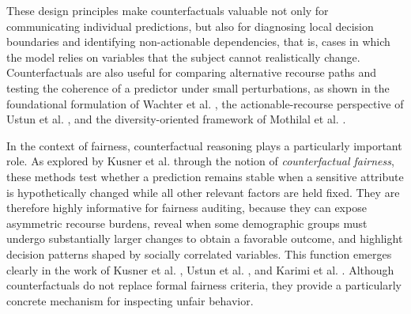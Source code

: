 These design principles make counterfactuals valuable not only for communicating individual predictions, but also for diagnosing local decision boundaries and identifying non-actionable dependencies, that is, cases in which the model relies on variables that the subject cannot realistically change. Counterfactuals are also useful for comparing alternative recourse paths and testing the coherence of a predictor under small perturbations, as shown in the foundational formulation of Wachter et al. \cite{wachter2017counterfactual}, the actionable-recourse perspective of Ustun et al. \cite{ustun2019actionable}, and the diversity-oriented framework of Mothilal et al. \cite{mothilal2020explaining}.

In the context of fairness, counterfactual reasoning plays a particularly important role. As explored by Kusner et al. \cite{kusner2017counterfactual} through the notion of \emph{counterfactual fairness}, these methods test whether a prediction remains stable when a sensitive attribute is hypothetically changed while all other relevant factors are held fixed. They are therefore highly informative for fairness auditing, because they can expose asymmetric recourse burdens, reveal when some demographic groups must undergo substantially larger changes to obtain a favorable outcome, and highlight decision patterns shaped by socially correlated variables. This function emerges clearly in the work of Kusner et al. \cite{kusner2017counterfactual}, Ustun et al. \cite{ustun2019actionable}, and Karimi et al. \cite{karimi2022survey}. Although counterfactuals do not replace formal fairness criteria, they provide a particularly concrete mechanism for inspecting unfair behavior.


